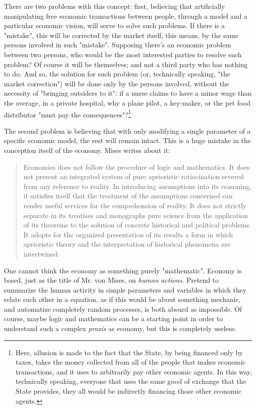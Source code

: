 \documentclass[12pt,a4paper,twoside]{book}
\begin{document}
There are two problems with this concept: first, believing that artificially manipulating free economic transactions between people, through a model and a particular economic vision, will serve to solve such problems. If there is a "mistake", this will be corrected by the market itself, this means, by the same persons involved in such "mistake". Supposing there's an economic problem between two persons, who would be the most interested parties to resolve such problem? Of course it will be themselves; and not a third party who has nothing to do. And so, the solution for such problem (or, technically speaking, "the market correction") will be done only by the persons involved, without the necessity of "bringing outsiders to it": if a nurse claims to have a minor wage than the average, in a private hospital, why a plane pilot, a key-maker, or the pet food distributor "must pay the consequences"?\footnote{Here, allusion is made to the fact that the State, by being financed only by taxes, takes the money collected from all of the people that makes economic transactions, and it uses to arbitrarily pay other economic agents. In this way, technically speaking, everyone that uses the same good of exchange that the State provides, they all would be indirectly financing those other economic agents.}

The second problem is believing that with only modifying a single parameter of a specific economic model, the rest will remain intact. This is a huge mistake in the conception itself of the economy. Mises writes about it:

\begin{quotation}
Economics does not follow the procedure of logic and mathematics. It does not present an integrated system of pure aprioristic ratiocination severed from any reference to reality. In introducing assumptions into its reasoning, it satisfies itself that the treatment of the assumptions concerned can render useful services for the comprehension of reality. It does not strictly separate in its treatises and monographs pure science from the application of its theorems to the solution of concrete historical and political problems. It adopts for the organized presentation of its results a form in which aprioristic theory and the interpretation of historical phenomena are intertwined. \cite[p. 66]{mises:ha}
\end{quotation}

One cannot think the economy as something purely "mathematic". Economy is based, just as the title of Mr. von Mises, on \textit{human actions}. Pretend to summarize the human activity in simple parameters and variables in which they relate each other in a equation, as if this would be about something mechanic, and automatize completely random processes, is both absurd as impossible. Of course, maybe logic and mathematics can be a starting point in order to understand such a complex \textit{praxis} as economy, but this is completely useless:
\end{document}
